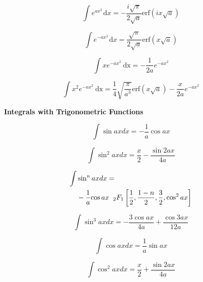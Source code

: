 \documentclass[11pt,twoside]{article}
\begin{document}
\begin{multicols}{3}
\begin{footnotesize}
\begin{equation}
\int e^{ax^2}\hspace{1pt}\text{d}x = -\frac{i\sqrt{\pi}}{2\sqrt{a}}\text{erf}\left(ix\sqrt{a}\right)
\end{equation}

\begin{equation}
\int e^{-ax^2}\hspace{1pt}\text{d}x = \frac{\sqrt{\pi}}{2\sqrt{a}}\text{erf}\left(x\sqrt{a}\right)
\end{equation}

\begin{equation}
\int x e^{-ax^2}\ \text{dx} = -\dfrac{1}{2a}e^{-ax^2}
\end{equation}

\begin{equation}
\int x^2 e^{-ax^2}\ \text{dx} = \dfrac{1}{4}\sqrt{\dfrac{\pi}{a^3}}\text{erf}(x\sqrt{a}) -\dfrac{x}{2a}e^{-ax^2}
\end{equation}

\columnbreak
\begin{center} \textbf {Integrals with Trigonometric Functions} \end{center}

\begin{equation}
\int \sin ax dx = -\frac{1}{a} \cos ax
\end{equation}

\begin{equation}
\int \sin^2 ax dx = \frac{x}{2} - \frac{\sin 2ax} {4a}
\end{equation}

\begin{align}
\int &\sin^n ax dx =
\nonumber \\ &
 -\frac{1}{a}{\cos ax} \hspace{2mm}{_2F_1}\left[
\frac{1}{2}, \frac{1-n}{2}, \frac{3}{2}, \cos^2 ax
\right]
\end{align}

\begin{equation}
\int \sin^3 ax dx = -\frac{3 \cos ax}{4a} + \frac{\cos 3ax} {12a}
\end{equation}

\begin{equation}
\int \cos ax dx= \frac{1}{a} \sin ax
\end{equation}

\begin{equation}
\int \cos^2 ax dx = \frac{x}{2}+\frac{ \sin 2ax}{4a}
\end{equation}


\end{footnotesize}
\end{multicols}
\end{document}
